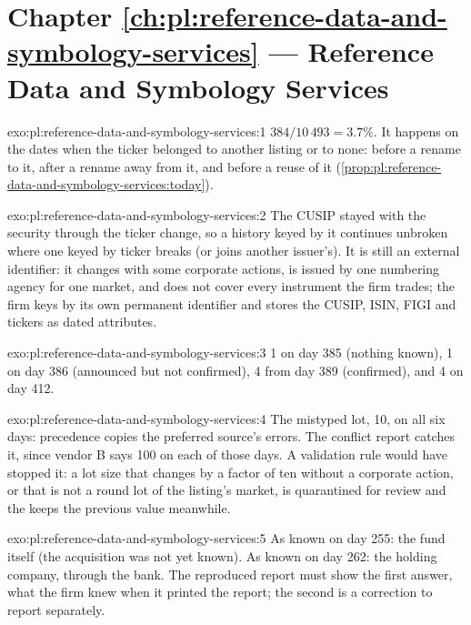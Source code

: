 \section*{Chapter \ref{ch:pl:reference-data-and-symbology-services} --- Reference Data and Symbology Services}

\begin{solution}{exo:pl:reference-data-and-symbology-services:1}
$384 / 10\,493 = 3.7\%$. It happens on the dates when the ticker belonged to another listing or to none: before a rename to it,
after a rename away from it, and before a reuse of it (\cref{prop:pl:reference-data-and-symbology-services:today}).
\end{solution}

\begin{solution}{exo:pl:reference-data-and-symbology-services:2}
The CUSIP stayed with the security through the ticker change, so a history keyed by it continues unbroken where one keyed by
ticker breaks (or joins another issuer's). It is still an external identifier: it changes with some corporate actions, is issued
by one numbering agency for one market, and does not cover every instrument the firm trades; the firm keys by its own permanent
identifier and stores the CUSIP, ISIN, FIGI and tickers as dated attributes.
\end{solution}

\begin{solution}{exo:pl:reference-data-and-symbology-services:3}
1 on day 385 (nothing known), 1 on day 386 (announced but not confirmed), 4 from day 389 (confirmed), and 4 on day 412.
\end{solution}

\begin{solution}{exo:pl:reference-data-and-symbology-services:4}
The mistyped lot, 10, on all six days: precedence copies the preferred source's errors. The conflict report catches it, since
vendor B says 100 on each of those days. A validation rule would have stopped it: a lot size that changes by a factor of ten
without a corporate action, or that is not a round lot of the listing's market, is quarantined for review and the  keeps
the previous value meanwhile.
\end{solution}

\begin{solution}{exo:pl:reference-data-and-symbology-services:5}
As known on day 255: the fund itself (the acquisition was not yet known). As known on day 262: the holding company, through the
bank. The reproduced report must show the first answer, what the firm knew when it printed the report; the second is a correction
to report separately.
\end{solution}

